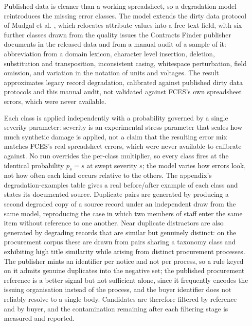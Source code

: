 \documentclass[conference]{IEEEtran}
\begin{document}
Published data is cleaner than a working spreadsheet, so a degradation
model reintroduces the missing error classes. The model extends the
dirty data protocol of Mudgal et al. \cite{mudgal2018}, which relocates
attribute values into a free text field, with six further classes
drawn from the quality issues the Contracts Finder publisher documents in
the released data and from a manual audit of a sample of it: abbreviation
from a domain
lexicon, character level insertion, deletion, substitution and
transposition, inconsistent casing, whitespace perturbation, field
omission, and variation in the notation of units and voltages. The
result approximates legacy record degradation, calibrated against
published dirty data protocols and this manual audit, not validated
against FCES's own spreadsheet errors, which were never available.

Each class is applied independently with a probability governed by a
single severity parameter: severity is an experimental stress
parameter that scales how much synthetic damage is applied, not a
claim that the resulting error mix matches FCES's real spreadsheet
errors, which were never available to calibrate against. No run
overrides the per-class multiplier, so every class fires at the
identical probability $p_s = s$ at swept severity $s$; the model
varies how errors look, not how often each kind occurs relative to
the others. The appendix's degradation-examples table gives a real
before/after example of each class and states its documented source. Duplicate pairs are generated by
producing a second degraded copy of a source record under an independent
draw from the same model, reproducing the case in which two members of
staff enter the same item without reference to one another. Near
duplicate distractors are also generated by degrading records that are
similar but genuinely distinct: on the procurement corpus these are
drawn from pairs sharing a taxonomy class and exhibiting high title
similarity while arising from distinct procurement processes. The
publisher mints an identifier per notice and not per process, so a
rule keyed on it admits genuine duplicates into the negative set; the
published procurement reference is a better signal but not sufficient
alone, since it frequently encodes the issuing organisation instead of
the process, and the buyer identifier does not reliably resolve to a
single body. Candidates are therefore filtered by reference and by
buyer, and the contamination remaining after each filtering stage is
measured and reported.
\end{document}
